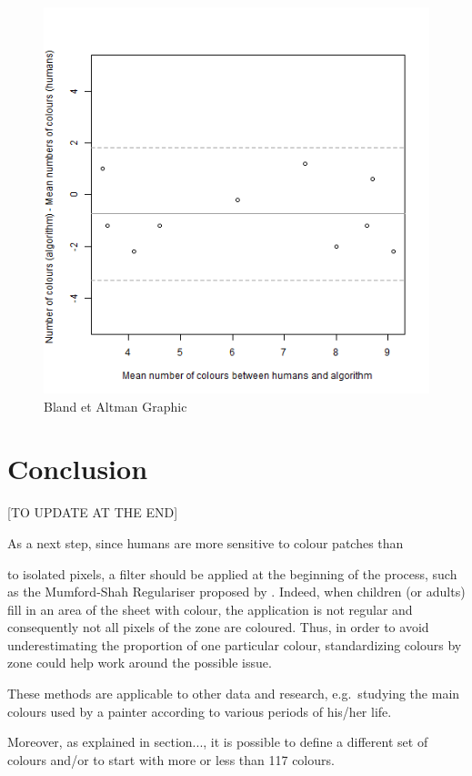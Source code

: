 \documentclass[11pt,a4paper]{article}
\begin{document}
\begin{figure}[h!]
	\centering
	\includegraphics[width=\linewidth]{figures/comp_nb_colours_agreement.png}
	\caption{Bland et Altman  Graphic}
	\label{fig:blandandaltman}
\end{figure}


\section{Conclusion}

{\color{red}[TO UPDATE AT THE END] }
{\color{gray} As a next step, since humans are more sensitive to colour patches than

to isolated pixels, a filter should be applied at the beginning of the
process, such as the Mumford-Shah Regulariser proposed by
\citet{erdem2009}. Indeed, when children (or adults) fill in an area of
the sheet with colour, the application is not regular and consequently
not all pixels of the zone are coloured. Thus, in order to avoid
underestimating the proportion of one particular colour, standardizing
colours by zone could help work around the possible issue.}

These methods are
applicable to other data and research, e.g.~studying the main colours
used by a painter according to various periods of his/her life.

Moreover, as explained in section..., it is possible to define a different set of colours and/or to start with more or less than 117 colours.



\end{document}
